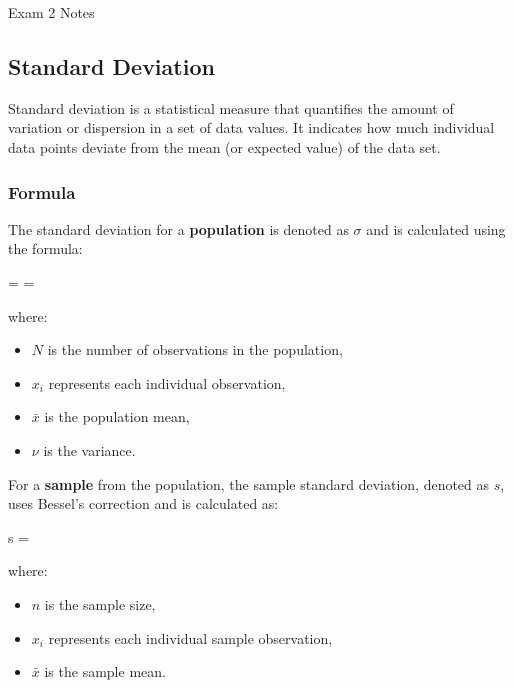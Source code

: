 \begin{examnotes}{Exam 2 Notes}
    \subsection*{Standard Deviation}

    Standard deviation is a statistical measure that quantifies the amount of variation or dispersion in a set of data values. It indicates how much individual data points deviate from the mean 
    (or expected value) of the data set.
    
    \subsubsection*{Formula}
    
    The standard deviation for a \textbf{population} is denoted as $\sigma$ and is calculated using the formula:
    
    \begin{center}
        \begin{highlightbox}
            \sigma =  = \sqrt{\nu}
        \end{highlightbox}
    \end{center}
    
    where:
    \begin{itemize}
        \item $N$ is the number of observations in the population,
        \item $x_i$ represents each individual observation,
        \item $\bar{x}$ is the population mean,
        \item $\nu$ is the variance.
    \end{itemize}
    
    For a \textbf{sample} from the population, the sample standard deviation, denoted as $s$, uses Bessel's correction and is calculated as:
    
    \begin{center}
        \begin{highlightbox}
            s = 
        \end{highlightbox}
    \end{center}
    
    where:
    \begin{itemize}
        \item $n$ is the sample size,
        \item $x_i$ represents each individual sample observation,
        \item $\bar{x}$ is the sample mean.
    \end{itemize}
    

\end{examnotes}
